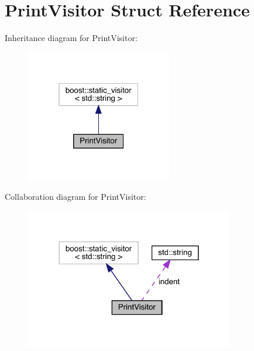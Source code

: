 \hypertarget{struct_print_visitor}{}\section{Print\+Visitor Struct Reference}
\label{struct_print_visitor}


Inheritance diagram for Print\+Visitor\+:\nopagebreak
\begin{figure}[H]
\begin{center}
\leavevmode
\includegraphics[width=181pt]{struct_print_visitor__inherit__graph}
\end{center}
\end{figure}


Collaboration diagram for Print\+Visitor\+:\nopagebreak
\begin{figure}[H]
\begin{center}
\leavevmode
\includegraphics[width=258pt]{struct_print_visitor__coll__graph}
\end{center}
\end{figure}
